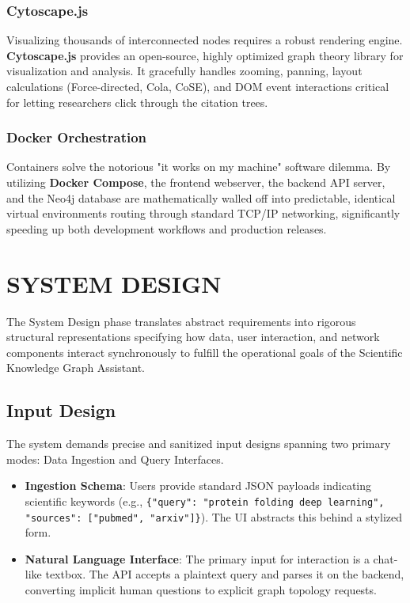 \documentclass[12pt,a4paper]{report}
\begin{document}
\subsection{Cytoscape.js}
Visualizing thousands of interconnected nodes requires a robust rendering engine. \textbf{Cytoscape.js} provides an open-source, highly optimized graph theory library for visualization and analysis. It gracefully handles zooming, panning, layout calculations (Force-directed, Cola, CoSE), and DOM event interactions critical for letting researchers click through the citation trees.

\subsection{Docker Orchestration}
Containers solve the notorious "it works on my machine" software dilemma. By utilizing \textbf{Docker Compose}, the frontend webserver, the backend API server, and the Neo4j database are mathematically walled off into predictable, identical virtual environments routing through standard TCP/IP networking, significantly speeding up both development workflows and production releases.

\chapter{SYSTEM DESIGN}
\noindent{\rule{\textwidth}{1.5pt}}

The System Design phase translates abstract requirements into rigorous structural representations specifying how data, user interaction, and network components interact synchronously to fulfill the operational goals of the Scientific Knowledge Graph Assistant.

\section{Input Design}
The system demands precise and sanitized input designs spanning two primary modes: Data Ingestion and Query Interfaces.
\begin{itemize}
    \item \textbf{Ingestion Schema}: Users provide standard JSON payloads indicating scientific keywords (e.g., \texttt{\{"query": "protein folding deep learning", "sources": ["pubmed", "arxiv"]\}}). The UI abstracts this behind a stylized form.
    \item \textbf{Natural Language Interface}: The primary input for interaction is a chat-like textbox. The API accepts a plaintext query and parses it on the backend, converting implicit human questions to explicit graph topology requests.
\end{itemize}
\end{document}
